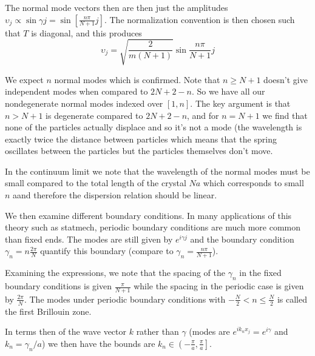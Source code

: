 \documentclass[10pt]{report}
\begin{document}
The normal mode vectors then are then just the amplitudes $\upsilon_j \propto \sin \gamma j = \sin \left[ \frac{n\pi}{N+1}j \right]$. The normalization convention is then chosen such that $T$ is diagonal, and this produces
$$\upsilon_j = \sqrt{\frac{2}{m(N+1)}}\sin \frac{n\pi}{N+1}j$$

We expect $n$ normal modes which is confirmed. Note that $n\geq N+1$ doesn't give independent modes when compared to $2N+2-n$. So we have all our nondegenerate normal modes indexed over $[1,n]$. The key argument is that $n > N+1$ is degenerate compared to $2N+2-n$, and for $n=N+1$ we find that none of the particles actually displace and so it's not a mode (the wavelength is exactly twice the distance between particles which means that the spring oscillates between the particles but the particles themselves don't move.

In the continuum limit we note that the wavelength of the normal modes must be small compared to the total length of the crystal $Na$ which corresponds to small $n$ aand therefore the dispersion relation should be linear.

We then examine different boundary conditions. In many applications of this theory such as statmech, periodic boundary conditions are much more common than fixed ends. The modes are still given by $e^{i\gamma j}$ and the boundary condition $\gamma_n = n\frac{2\pi}{N}$ quantify this boundary (compare to $\gamma_n = \frac{n\pi}{N+1}$).

Examining the expressions, we note that the spacing of the $\gamma_n$ in the fixed boundary conditions is given $\frac{\pi}{N+1}$ while the spacing in the periodic case is given by $\frac{2\pi}{N}$. The modes under periodic boundary conditions with $-\frac{N}{2}<n\leq\frac{N}{2}$ is called the first Brillouin zone.

In terms then of the wave vector $k$ rather than $\gamma$ (modes are $e^{ik_nx_j} = e^{i\gamma}$ and $k_n = \gamma_n/a$) we then have the bounds are $k_n \in \left( -\frac{\pi}{a},\frac{\pi}{a} \right]$.
\end{document}
